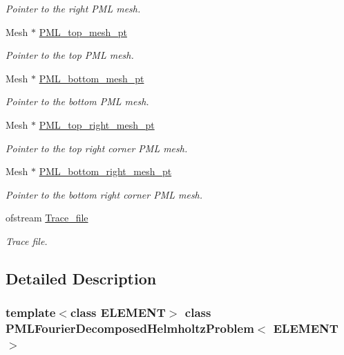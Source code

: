 \begin{DoxyCompactItemize}
\begin{DoxyCompactList}\small\item\em Pointer to the right P\+ML mesh. \end{DoxyCompactList}\item 
Mesh $\ast$ \hyperlink{classPMLFourierDecomposedHelmholtzProblem_a4fe4cd439faae2086ab1ed786cbc610a}{P\+M\+L\+\_\+top\+\_\+mesh\+\_\+pt}
\begin{DoxyCompactList}\small\item\em Pointer to the top P\+ML mesh. \end{DoxyCompactList}\item 
Mesh $\ast$ \hyperlink{classPMLFourierDecomposedHelmholtzProblem_ad7611d07d182b33a5e2f848bc4ff5572}{P\+M\+L\+\_\+bottom\+\_\+mesh\+\_\+pt}
\begin{DoxyCompactList}\small\item\em Pointer to the bottom P\+ML mesh. \end{DoxyCompactList}\item 
Mesh $\ast$ \hyperlink{classPMLFourierDecomposedHelmholtzProblem_af0787c8610bbae59be3d061e57072c11}{P\+M\+L\+\_\+top\+\_\+right\+\_\+mesh\+\_\+pt}
\begin{DoxyCompactList}\small\item\em Pointer to the top right corner P\+ML mesh. \end{DoxyCompactList}\item 
Mesh $\ast$ \hyperlink{classPMLFourierDecomposedHelmholtzProblem_a8c3d30400cb9e4a709e1f8f8ee66785a}{P\+M\+L\+\_\+bottom\+\_\+right\+\_\+mesh\+\_\+pt}
\begin{DoxyCompactList}\small\item\em Pointer to the bottom right corner P\+ML mesh. \end{DoxyCompactList}\item 
ofstream \hyperlink{classPMLFourierDecomposedHelmholtzProblem_a9810d1dd58cec1f8b1cfc54ea37a7efd}{Trace\+\_\+file}
\begin{DoxyCompactList}\small\item\em Trace file. \end{DoxyCompactList}\end{DoxyCompactItemize}


\subsection{Detailed Description}
\subsubsection*{template$<$class E\+L\+E\+M\+E\+NT$>$\newline
class P\+M\+L\+Fourier\+Decomposed\+Helmholtz\+Problem$<$ E\+L\+E\+M\+E\+N\+T $>$}

